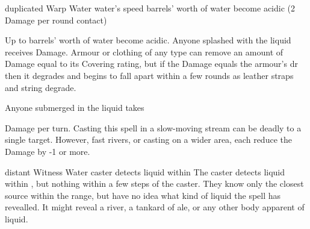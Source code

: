   {duplicated}%
  {Warp}%
  {Water}%
  {water's speed}%
  { barrels' worth of water become acidic (2 Damage per round contact)}%
  {
    Up to  barrels' worth of water become acidic.
    Anyone splashed with the liquid receives  Damage. 
    Armour or clothing of any type can remove an amount of Damage equal to its Covering rating, but if the Damage equals the armour's \gls{dr} then it degrades and begins to fall apart within a few rounds as leather straps and string degrade.

    Anyone submerged in the liquid takes \addtocounter{spelllevel}{2}  Damage per turn.
    Casting this spell in a slow-moving stream can be deadly to a single target.
    However, fast rivers, or casting on a wider area, each reduce the Damage by -1 or more.
  }

  {distant}%
  {Witness}%
  {Water}%
  {}%
  {caster detects liquid within \spellRange}%
  {
    The caster detects liquid within \spellRange, but nothing within a few steps of the caster.
    They know only the closest source within the range, but have no idea what kind of liquid the spell has revealled.
    It might reveal a river, a tankard of ale, or any other body apparent of liquid.
  }
